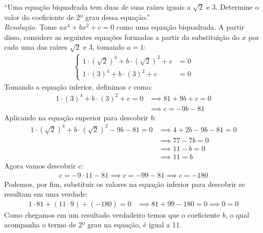 \enquote{Uma equação biquadrada tem duas de suas raízes iguais a $\sqrt{2}$ e 3. Determine o valor do coeficiente de 2º grau dessa equação.} 
\\
\emph{Resolução.} Tome $ax^4 + bx^2 + c = 0$ como uma equação biquadrada. A partir disso, considere as seguintes equações formadas a partir da substituição do $x$ por cada uma das raízes $\sqrt{2}$ e 3, tomando $a = 1$:
\begin{align*}
    \left\{ 
        \begin{matrix}
            1 \cdot (\sqrt{2})^4 + b \cdot (\sqrt{2})^2 + c & = 0 \\
            1 \cdot (3)^4 + b \cdot (3)^2 + c & = 0
        \end{matrix}
    \right.
\end{align*}
Tomando a equação inferior, definimos $c$ como:
\begin{align*}
    1 \cdot (3)^4 + b \cdot (3)^2 + c = 0 & \implies 81 + 9b + c = 0 \\ & \implies
    c = - 9b - 81
\end{align*}
Aplicando na equação superior para descobrir $b$:
\begin{align*}
    1 \cdot (\sqrt{2})^4 + b \cdot (\sqrt{2})^2 - 9b - 81 = 0 & \implies
    4 + 2b - 9b - 81 = 0 \\ & \implies
    77 - 7b = 0 \\ & \implies
    11 - b = 0 \\ & \implies
    11 = b
\end{align*}
Agora vamos descobrir $c$:
\begin{align*}
    c = -9\cdot11 - 81 \implies c = -99 - 81 \implies c = -180
\end{align*}
Podemos, por fim, substituir os valores na equação inferior para descobrir se resultam em uma verdade:
\begin{align*}
    1 \cdot 81 + (11 \cdot 9) + (-180) = 0 & \implies 81 + 99 - 180 = 0 \implies 0 = 0
\end{align*}
Como chegamos em um resultado verdadeiro temos que o coeficiente $b$, o qual acompanha o termo de 2º grau na equação, é igual a 11.